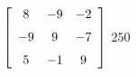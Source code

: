 {$\left[ \begin {array}{ccc} 8&-9&-2\\\noalign{\medskip}-9&9&-7
\\\noalign{\medskip}5&-1&9\end {array} \right] $} 
{$250$}

  

 

